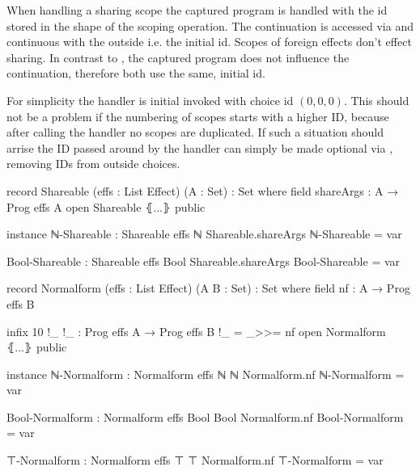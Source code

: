When handling a sharing scope the captured program is handled with the id stored
in the shape of the scoping operation.
The continuation is accessed via \AgdaFunction{>>=} and continuous with the
outside i.e. the initial id.
Scopes of foreign effects don't effect sharing.
In contrast to , the captured program does not influence the
continuation, therefore both use the same, initial id.

For simplicity the handler is initial invoked with choice id $(0,0,0)$.
This should not be a problem if the numbering of scopes starts with a higher ID,
because after calling the  handler no scopes are duplicated.
If such a situation should arrise the ID passed around by the handler can simply
be made optional via , removing IDs from outside choices.

\begin{code}[hide]
record Shareable (effs : List Effect) (A : Set) : Set where
  field
    shareArgs : A → Prog effs A
open Shareable ⦃...⦄ public

instance
  ℕ-Shareable : Shareable effs ℕ
  Shareable.shareArgs ℕ-Shareable = var

  Bool-Shareable : Shareable effs Bool
  Shareable.shareArgs Bool-Shareable = var

record Normalform (effs : List Effect) (A B : Set) : Set where
  field
    nf : A → Prog effs B

  infix 10 !_
  !_ : Prog effs A → Prog effs B
  !_ = _>>= nf
open Normalform ⦃...⦄ public

instance
  ℕ-Normalform : Normalform effs ℕ ℕ
  Normalform.nf ℕ-Normalform = var

  Bool-Normalform : Normalform effs Bool Bool
  Normalform.nf Bool-Normalform = var

  ⊤-Normalform : Normalform effs ⊤ ⊤
  Normalform.nf ⊤-Normalform = var
\end{code}

